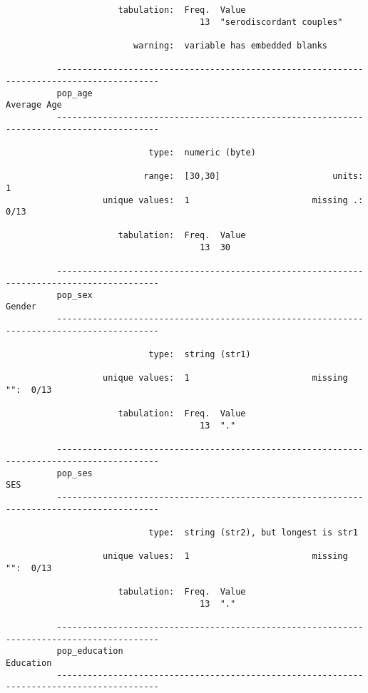 \documentclass{article}
\begin{document}
\begin{verbatim}
                      tabulation:  Freq.  Value
                                      13  "serodiscordant couples"
          
                         warning:  variable has embedded blanks
          
          ------------------------------------------------------------------------------------------
          pop_age                                                                        Average Age
          ------------------------------------------------------------------------------------------
          
                            type:  numeric (byte)
          
                           range:  [30,30]                      units:  1
                   unique values:  1                        missing .:  0/13
          
                      tabulation:  Freq.  Value
                                      13  30
          
          ------------------------------------------------------------------------------------------
          pop_sex                                                                             Gender
          ------------------------------------------------------------------------------------------
          
                            type:  string (str1)
          
                   unique values:  1                        missing "":  0/13
          
                      tabulation:  Freq.  Value
                                      13  "."
          
          ------------------------------------------------------------------------------------------
          pop_ses                                                                                SES
          ------------------------------------------------------------------------------------------
          
                            type:  string (str2), but longest is str1
          
                   unique values:  1                        missing "":  0/13
          
                      tabulation:  Freq.  Value
                                      13  "."
          
          ------------------------------------------------------------------------------------------
          pop_education                                                                    Education
          ------------------------------------------------------------------------------------------
          

\end{verbatim}
\end{document}
